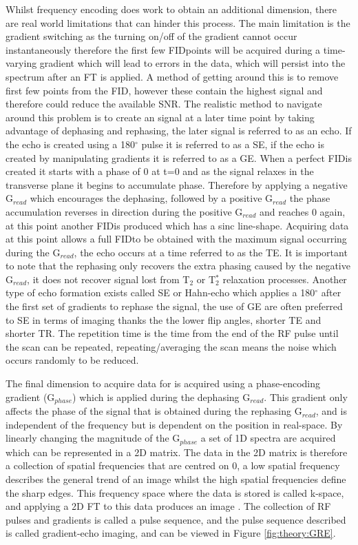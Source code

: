 Whilst frequency encoding does work to obtain an additional dimension, there are real world limitations that can hinder this process. The main limitation is the gradient switching as the turning on/off of the gradient cannot occur instantaneously therefore the first few \ac{FID}points will be acquired during a time-varying gradient which will lead to errors in the data, which will persist into the spectrum after an \ac{FT} is applied. A method of getting around this is to remove first few points from the \ac{FID}, however these contain the highest signal and therefore could reduce the available \ac{SNR}. The realistic method to navigate around this problem is to create an signal at a later time point by taking advantage of dephasing and rephasing, the later signal is referred to as an echo. If the echo is created using a 180$^\circ$ pulse it is referred to as a \ac{SE}, if the echo is created by manipulating gradients it is referred to as a \ac{GE}. When a perfect \ac{FID}is created it starts with a phase of 0 at t=0 and as the signal relaxes in the transverse plane it begins to accumulate phase. Therefore by applying a negative G$_{read}$ which encourages the dephasing, followed by a positive G$_{read}$ the phase accumulation reverses in direction during the positive G$_{read}$ and reaches 0 again, at this point another \ac{FID}is produced which has a sinc line-shape. Acquiring data at this point allows a full \ac{FID}to be obtained with the maximum signal occurring during the G$_{read}$, the echo occurs at a time referred to as the \ac{TE}. It is important to note that the rephasing only recovers the extra phasing caused by the negative G$_{read}$, it does not recover signal lost from T$_2$ or T$_2^*$ relaxation processes. Another type of echo formation exists called \ac{SE} or Hahn-echo \cite{Hahn1950SpinEchoes} which applies a 180$^\circ$ after the first set of gradients to rephase the signal, the use of \ac{GE} are often preferred to SE in terms of imaging thanks the the lower flip angles, shorter \ac{TE} and shorter \ac{TR}. The repetition time is the time from the end of the \ac{RF} pulse until the scan can be repeated, repeating/averaging the scan means the noise which occurs randomly to be reduced.

The final dimension to acquire data for is acquired using a phase-encoding gradient (G$_{phase}$) which is applied during the dephasing G$_{read}$. This gradient only affects the phase of the signal that is obtained during the rephasing G$_{read}$, and is independent of the frequency but is dependent on the position in real-space. By linearly changing the magnitude of the G$_{phase}$ a set of 1D spectra are acquired which can be represented in a 2D matrix. The data in the 2D matrix is therefore a collection of spatial frequencies that are centred on 0, a low spatial frequency describes the general trend of an image whilst the high spatial frequencies define the sharp edges. This frequency space where the data is stored is called k-space, and applying a 2D \ac{FT} to this data produces an image \cite{Lauterbur1973ImageResonance, Mansfield1977Multi-planarEchoes}. The collection of \ac{RF} pulses and gradients is called a pulse sequence, and the pulse sequence described is called gradient-echo imaging, and can be viewed in Figure \ref{fig:theory:GRE}.


